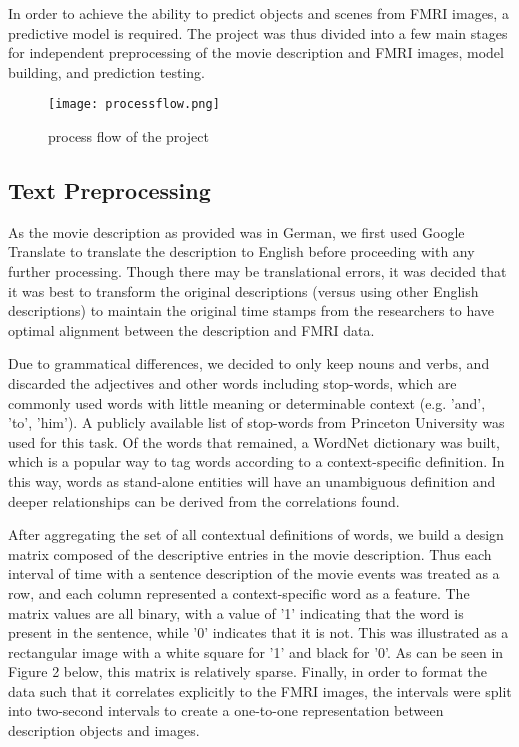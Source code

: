 \par In order to achieve the ability to predict objects and scenes 
from FMRI images, a predictive model is required. The project was thus 
divided into a few main stages for independent preprocessing of the 
movie description and FMRI images, model building, and prediction
testing.

\begin{figure}[!htbp]
\centering
\texttt{[image: processflow.png]}
\caption{\label{fig:processflow} process flow of the project}
\end{figure}

\subsection{Text Preprocessing}
\par As the movie description as provided was in German, we first used Google
Translate to translate the description to English before proceeding with 
any further processing. Though there may be translational errors, it was decided that it was best to transform the original descriptions (versus using other English descriptions) to maintain the original time stamps from the researchers to have optimal alignment between the description and FMRI data.

\par Due to grammatical differences, we decided to only keep nouns and verbs, and discarded the adjectives and other words including stop-words, which are commonly used words with little meaning or determinable context (e.g. 'and', 'to', 'him'). A publicly available list of stop-words from Princeton University was used for this task. Of the words that remained, a WordNet dictionary was built, which is a popular way to tag words according to a context-specific definition. In this way, words as stand-alone entities will have an unambiguous definition and deeper relationships can be derived from the correlations found. 

 \par After aggregating the set of all contextual definitions of words,
 we build a design matrix composed of the descriptive entries in the movie description. Thus each interval of time with a sentence description of the movie events was treated as a row, and each column represented a context-specific word as a feature. The matrix values are all binary, with a value of '1' indicating that the word is present in the sentence, while '0' indicates that it is not. This was illustrated as a rectangular image with a white square for '1' and black for '0'. As can be seen in Figure 2 below, this matrix is relatively sparse. Finally, in order to format the data such that it correlates explicitly
to the FMRI images, the intervals were split into two-second intervals
to create a one-to-one representation between description objects and images.
\clearpage

